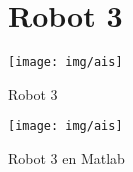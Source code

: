 \begin{figure}
	\section{Robot 3} %
	\centering	\texttt{[image: img/ais]}
	\caption{Robot 3} %
	\label{fig:robot3}
\end{figure}


\begin{figure}
	\centering	\texttt{[image: img/ais]}
	\caption{Robot 3 en Matlab} %
	\label{fig:robot_3}
\end{figure}
